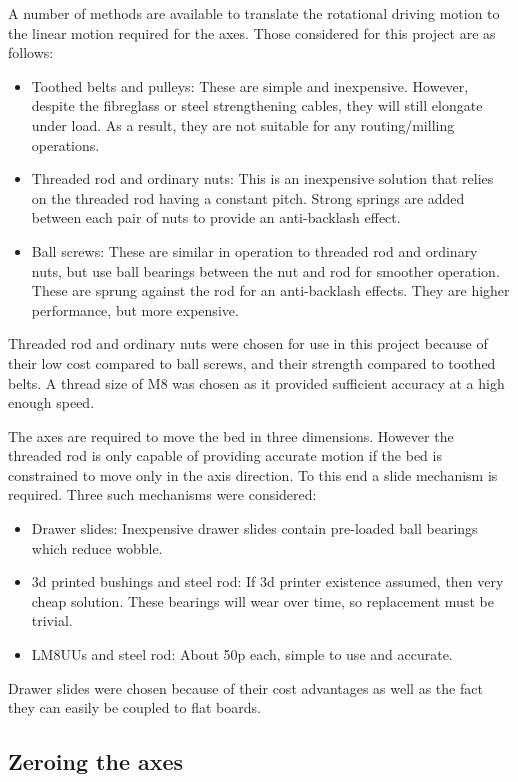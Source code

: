 A number of methods are available to translate the rotational driving
 motion to the linear motion required for the axes. Those
considered for this project are as follows:

\begin{itemize}
	\item	Toothed belts and pulleys: These are simple and inexpensive. However, despite the fibreglass or steel strengthening cables, they will
			still elongate under load. As a result, they are not suitable for any routing/milling operations.
	\item	Threaded rod and ordinary nuts: This is an inexpensive solution that relies on the threaded rod having a constant pitch. Strong springs 
			are added between each pair of nuts to provide an anti-backlash effect.
	\item	Ball screws: These are similar in operation to threaded rod and ordinary nuts, but use ball bearings between the nut and rod for smoother
			operation. These are sprung against the rod for an anti-backlash effects. They are higher performance, but more expensive.
\end{itemize}
Threaded rod and ordinary nuts were chosen for use in this project because
of their low cost compared to ball screws, and their strength compared
to toothed belts. A thread size of M8 was chosen as it provided sufficient
accuracy at a high enough speed.

The axes are required to move the bed in three dimensions. However the 
threaded rod is only capable of providing accurate motion if the bed
is constrained to move only in the axis direction. To this end a slide
mechanism is required. Three such mechanisms were considered:

\begin{itemize}
	\item	Drawer slides: Inexpensive drawer slides contain pre-loaded ball bearings which reduce wobble.
	\item	3d printed bushings and steel rod: If 3d printer existence assumed, then very cheap solution. These bearings
			will wear over time, so replacement must be trivial.
	\item	LM8UUs and steel rod: About 50p each, simple to use and accurate.
\end{itemize}

Drawer slides were chosen because of their cost advantages as well as the fact
they can easily be coupled to flat boards.


\subsection{Zeroing the axes}

